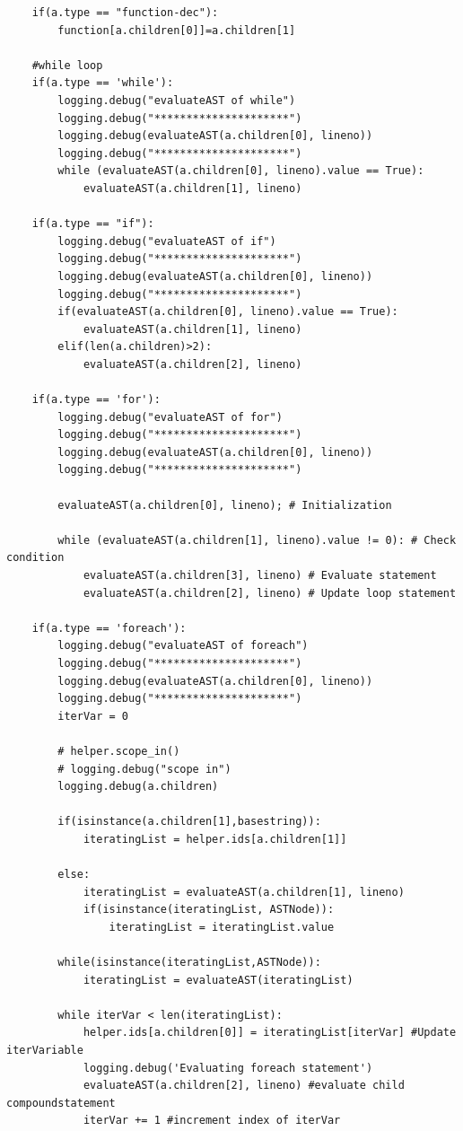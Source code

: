 \documentclass[a4paper]{article}
\begin{document}
\begin{verbatim}
    if(a.type == "function-dec"):
        function[a.children[0]]=a.children[1]

    #while loop
    if(a.type == 'while'):
        logging.debug("evaluateAST of while")
        logging.debug("*********************")
        logging.debug(evaluateAST(a.children[0], lineno))
        logging.debug("*********************")
        while (evaluateAST(a.children[0], lineno).value == True):
            evaluateAST(a.children[1], lineno)

    if(a.type == "if"):
        logging.debug("evaluateAST of if")
        logging.debug("*********************")
        logging.debug(evaluateAST(a.children[0], lineno))
        logging.debug("*********************")
        if(evaluateAST(a.children[0], lineno).value == True):
            evaluateAST(a.children[1], lineno)
        elif(len(a.children)>2):
            evaluateAST(a.children[2], lineno)

    if(a.type == 'for'):
        logging.debug("evaluateAST of for")
        logging.debug("*********************")
        logging.debug(evaluateAST(a.children[0], lineno))
        logging.debug("*********************")

        evaluateAST(a.children[0], lineno); # Initialization

        while (evaluateAST(a.children[1], lineno).value != 0): # Check condition
            evaluateAST(a.children[3], lineno) # Evaluate statement
            evaluateAST(a.children[2], lineno) # Update loop statement
            
    if(a.type == 'foreach'):
        logging.debug("evaluateAST of foreach")
        logging.debug("*********************")
        logging.debug(evaluateAST(a.children[0], lineno))
        logging.debug("*********************")
        iterVar = 0
        
        # helper.scope_in()
        # logging.debug("scope in")
        logging.debug(a.children) 

        if(isinstance(a.children[1],basestring)):
            iteratingList = helper.ids[a.children[1]]

        else:
            iteratingList = evaluateAST(a.children[1], lineno)
            if(isinstance(iteratingList, ASTNode)):
                iteratingList = iteratingList.value
        
        while(isinstance(iteratingList,ASTNode)):
            iteratingList = evaluateAST(iteratingList)
        
        while iterVar < len(iteratingList):
            helper.ids[a.children[0]] = iteratingList[iterVar] #Update iterVariable
            logging.debug('Evaluating foreach statement')
            evaluateAST(a.children[2], lineno) #evaluate child compoundstatement
            iterVar += 1 #increment index of iterVar


\end{verbatim}
\end{document}
